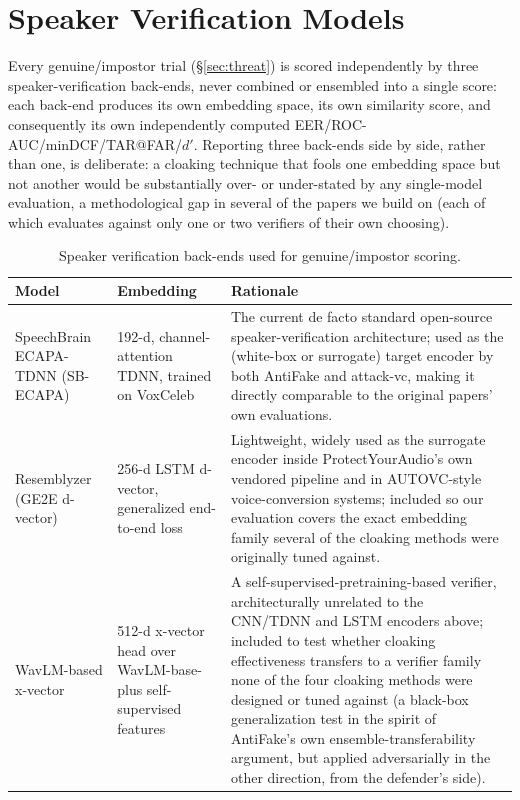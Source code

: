 \documentclass[11pt]{article}
\begin{document}
\section{Speaker Verification Models}
\label{sec:verifiers}

Every genuine/impostor trial (\S\ref{sec:threat}) is scored
independently by three speaker-verification back-ends, never combined
or ensembled into a single score: each back-end produces its own
embedding space, its own similarity score, and consequently its own
independently computed EER/ROC-AUC/minDCF/TAR@FAR/$d'$. Reporting three
back-ends side by side, rather than one, is deliberate: a cloaking
technique that fools one embedding space but not another would be
substantially over- or under-stated by any single-model evaluation, a
methodological gap in several of the papers we build on (each of which
evaluates against only one or two verifiers of their own choosing).

\begin{table}[H]
\centering
\caption{Speaker verification back-ends used for genuine/impostor scoring.}
\label{tab:verifiers}
\begin{tabular}{p{2.4cm}p{2.6cm}p{7.2cm}}
\toprule
Model & Embedding & Rationale \\
\midrule
SpeechBrain ECAPA-TDNN (SB-ECAPA)~\cite{desplanques2020ecapa}
  & 192-d, channel-attention TDNN, trained on VoxCeleb
  & The current de facto standard open-source speaker-verification
    architecture; used as the (white-box or surrogate) target encoder
    by both AntiFake and attack-vc, making it directly comparable to
    the original papers' own evaluations. \\
Resemblyzer (GE2E d-vector)
  & 256-d LSTM d-vector, generalized end-to-end loss
  & Lightweight, widely used as the surrogate encoder inside
    ProtectYourAudio's own vendored pipeline and in AUTOVC-style
    voice-conversion systems; included so our evaluation covers the
    exact embedding family several of the cloaking methods were
    originally tuned against. \\
WavLM-based x-vector~\cite{chen2022wavlm}
  & 512-d x-vector head over WavLM-base-plus self-supervised features
  & A self-supervised-pretraining-based verifier, architecturally
    unrelated to the CNN/TDNN and LSTM encoders above; included to
    test whether cloaking effectiveness transfers to a verifier family
    none of the four cloaking methods were designed or tuned against
    (a black-box generalization test in the spirit of AntiFake's own
    ensemble-transferability argument, but applied adversarially in
    the other direction, from the defender's side). \\
\bottomrule
\end{tabular}
\end{table}
\end{document}
